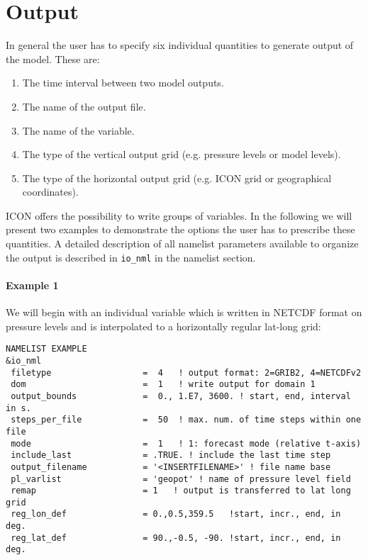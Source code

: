 \chapter{Output}



In general the user has to specify six individual quantities to generate output of the model. These are:

\begin{enumerate}
\item{The time interval between two model outputs.}
\item{The name of the output file.}
\item{The name of the variable.}
\item{The type of the vertical output grid (e.g. pressure levels or model levels).}
\item{The type of the horizontal output grid (e.g. ICON grid or geographical coordinates).}
\end{enumerate}

ICON offers the possibility to write groups of variables. 
In the following we will present two examples to demonstrate the options the user has to prescribe these quantities. A detailed description of all namelist parameters available to organize the output is described  in \verb+io_nml+ in the namelist section.

\subsubsection{Example 1}

We will begin with an individual variable which is written in NETCDF format on pressure levels and is interpolated to a horizontally regular lat-long grid:

\begin{Verbatim}[frame=single]
NAMELIST EXAMPLE
&io_nml
 filetype                  =  4   ! output format: 2=GRIB2, 4=NETCDFv2
 dom                       =  1   ! write output for domain 1
 output_bounds             =  0., 1.E7, 3600. ! start, end, interval in s.
 steps_per_file            =  50  ! max. num. of time steps within one file
 mode                      =  1   ! 1: forecast mode (relative t-axis)
 include_last              = .TRUE. ! include the last time step
 output_filename           = '<INSERTFILENAME>' ! file name base
 pl_varlist                = 'geopot' ! name of pressure level field
 remap                     = 1   ! output is transferred to lat long grid
 reg_lon_def               = 0.,0.5,359.5   !start, incr., end, in deg.
 reg_lat_def               = 90.,-0.5, -90. !start, incr., end, in deg.
\end{Verbatim}




